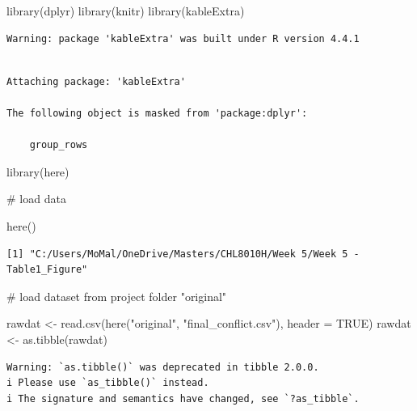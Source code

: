 \documentclass[
  letterpaper,
  DIV=11,
  numbers=noendperiod]{scrartcl}
\newenvironment{Shaded}{\begin{snugshade}}{\end{snugshade}}
\newcommand{\AttributeTok}[1]{\textcolor[rgb]{0.40,0.45,0.13}{#1}}
\newcommand{\CommentTok}[1]{\textcolor[rgb]{0.37,0.37,0.37}{#1}}
\newcommand{\ConstantTok}[1]{\textcolor[rgb]{0.56,0.35,0.01}{#1}}
\newcommand{\FunctionTok}[1]{\textcolor[rgb]{0.28,0.35,0.67}{#1}}
\newcommand{\NormalTok}[1]{\textcolor[rgb]{0.00,0.23,0.31}{#1}}
\newcommand{\OtherTok}[1]{\textcolor[rgb]{0.00,0.23,0.31}{#1}}
\newcommand{\StringTok}[1]{\textcolor[rgb]{0.13,0.47,0.30}{#1}}
\begin{document}
\begin{Shaded}
\begin{Highlighting}[]
\FunctionTok{library}\NormalTok{(dplyr)}
\FunctionTok{library}\NormalTok{(knitr)}
\FunctionTok{library}\NormalTok{(kableExtra)}
\end{Highlighting}
\end{Shaded}

\begin{verbatim}
Warning: package 'kableExtra' was built under R version 4.4.1
\end{verbatim}

\begin{verbatim}

Attaching package: 'kableExtra'

The following object is masked from 'package:dplyr':

    group_rows
\end{verbatim}

\begin{Shaded}
\begin{Highlighting}[]
\FunctionTok{library}\NormalTok{(here)}

\CommentTok{\# load data }

\FunctionTok{here}\NormalTok{()}
\end{Highlighting}
\end{Shaded}

\begin{verbatim}
[1] "C:/Users/MoMal/OneDrive/Masters/CHL8010H/Week 5/Week 5 - Table1_Figure"
\end{verbatim}

\begin{Shaded}
\begin{Highlighting}[]
\CommentTok{\# load dataset from project folder "original"}

\NormalTok{rawdat }\OtherTok{\textless{}{-}} \FunctionTok{read.csv}\NormalTok{(}\FunctionTok{here}\NormalTok{(}\StringTok{"original"}\NormalTok{, }\StringTok{"final\_conflict.csv"}\NormalTok{), }\AttributeTok{header =} \ConstantTok{TRUE}\NormalTok{)}
\NormalTok{rawdat }\OtherTok{\textless{}{-}} \FunctionTok{as.tibble}\NormalTok{(rawdat)}
\end{Highlighting}
\end{Shaded}

\begin{verbatim}
Warning: `as.tibble()` was deprecated in tibble 2.0.0.
i Please use `as_tibble()` instead.
i The signature and semantics have changed, see `?as_tibble`.
\end{verbatim}
\end{document}
